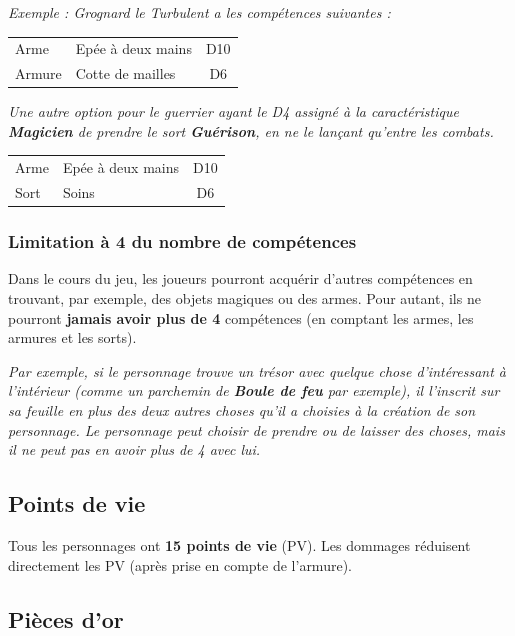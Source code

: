 \documentclass[a4paper, 11pt, twoside]{article}
\begin{document}
\emph{Exemple : Grognard le Turbulent a les compétences suivantes :}

\begin{longtable}{l|l|c}
\hline
Arme & Epée à deux mains & D10\\
Armure & Cotte de mailles & D6\\
\end{longtable}

\emph{Une autre option pour le guerrier ayant le D4 assigné à la caractéristique \textbf{Magicien} de prendre le sort \textbf{Guérison}, en ne le lançant qu'entre les combats.}

\begin{longtable}{l|l|c}
\hline
Arme & Epée à deux mains & D10\\
Sort & Soins & D6\\
\end{longtable}

\subsubsection{Limitation à 4 du nombre de compétences}
\label{sec:org5a0100b}

Dans le cours du jeu, les joueurs pourront acquérir d'autres compétences en trouvant, par exemple, des objets magiques ou des armes. Pour autant, ils ne pourront \textbf{jamais avoir plus de 4} compétences (en comptant les armes, les armures et les sorts).

\emph{Par exemple, si le personnage trouve un trésor avec quelque chose d'intéressant à l'intérieur (comme un parchemin de \textbf{Boule de feu} par exemple), il l'inscrit sur sa feuille en plus des deux autres choses qu'il a choisies à la création de son personnage. Le personnage peut choisir de prendre ou de laisser des choses, mais il ne peut pas en avoir plus de 4 avec lui.}

\subsection{Points de vie}
\label{sec:org1c0f03d}

Tous les personnages ont \textbf{15 points de vie} (PV). Les dommages réduisent directement les PV (après prise en compte de l'armure).

\subsection{Pièces d'or}
\label{sec:org3b39a24}
\end{document}
